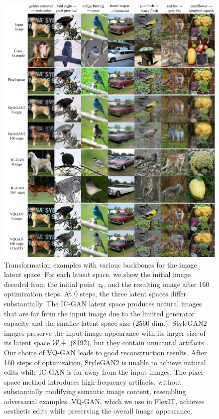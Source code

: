 \begin{figure}[H]
    \centering
    \includegraphics[width=0.9\linewidth]{images/flexit/assets/encoder2.pdf}
    \caption{Transformation examples with various backbones for the image latent space. For each latent space, 
    we show the initial image decoded from the initial point $z_0$, and the resulting image after 160 optimization steps. 
    At 0 steps, the three latent spaces differ substantially. The IC-GAN latent space 
    produces natural images that are far from the input image due to the limited generator capacity and the 
     smaller latent space size (2560 dim.). StyleGAN2 images preserve the input image 
    appearance with its larger size of its latent space $\mathcal{W+}$ (8192), but they contain
      unnatural artifacts \citep{tov2021designing}. 
     Our choice of VQ-GAN leads to good reconstruction results.
    After 160 steps of optimization, StyleGAN2 is unable to achieve natural edits while IC-GAN is 
    far away from the input images. The pixel-space method introduces high-frequency artifacts, 
    without substantially modifying semantic 
    image content, resembling adversarial examples. 
    VQ-GAN, which we use in FlexIT, achieves aesthetic edits while preserving the overall image appearance.
    }
\label{fig:encoders2}
\end{figure}





